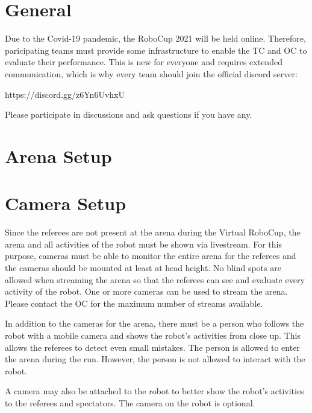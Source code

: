 
\section{General} 
\label{sec:General}

Due to the Covid-19 pandemic, the RoboCup 2021 will be held online. 
Therefore, paricipating teams must provide some infrastructure to enable the TC and OC to evaluate their performance.
This is new for everyone and requires extended communication, which is why every team should join the official discord server:

https://discord.gg/z6Yn6UvhxU

Please participate in discussions and ask questions if you have any.


\section{Arena Setup} 
\label{sec:VRCArenaSetup}




\section{Camera Setup} 
\label{sec:CameraSetup}


Since the referees are not present at the arena during the Virtual RoboCup, the arena and all activities of the robot must be shown via livestream. For this purpose, cameras must be able to monitor the entire arena for the referees and the cameras should be mounted at least at head height. No blind spots are allowed when streaming the arena so that the referees can see and evaluate every activity of the robot. One or more cameras can be used to stream the arena. Please contact the OC for the maximum number of streams available.
\par
In addition to the cameras for the arena, there must be a person who follows the robot with a mobile camera and shows the robot's activities from close up. This allows the referees to detect even small mistakes. The person is allowed to enter the arena during the run. However, the person is not allowed to interact with the robot.
\par
A camera may also be attached to the robot to better show the robot's activities to the referees and spectators. The camera on the robot is optional.



